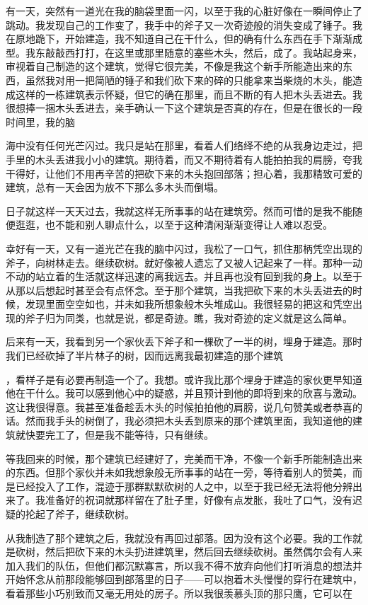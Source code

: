 \documentclass{article}
\begin{document}
有一天，突然有一道光在我的脑袋里面一闪，以至于我的心脏好像在一瞬间停止了跳动。我发现自己的工作变了，我手中的斧子又一次奇迹般的消失变成了锤子。我在原地跪下，开始建造，我不知道自己在干什么，但的确有什么东西在手下渐渐成型。我东敲敲西打打，在这里或那里随意的塞些木头，然后，成了。我站起身来，审视着自己制造的这个建筑，觉得它很完美，不像是我这个新手所能造出来的东西，虽然我对用一把简陋的锤子和我们砍下来的碎的只能拿来当柴烧的木头，能造成这样的一栋建筑表示怀疑，但它的确在那里，而且不断的有人把木头丢进去。我很想捧一捆木头丢进去，亲手确认一下这个建筑是否真的存在，但是在很长的一段时间里，我的脑

\newpage 

海中没有任何光芒闪过。我只是站在那里，看着人们络绎不绝的从我身边走过，把手里的木头丢进我小小的建筑。期待着，而又不期待着有人能拍拍我的肩膀，夸我干得好，让他们不用再辛苦的把砍下来的木头抱回部落；担心着，我那精致可爱的建筑，总有一天会因为放不下那么多木头而倒塌。

日子就这样一天天过去，我就这样无所事事的站在建筑旁。然而可惜的是我不能随便逛逛，也不能和别人聊点什么，以至于这种清闲渐渐变得让人难以忍受。

幸好有一天，又有一道光芒在我的脑中闪过，我松了一口气，抓住那柄凭空出现的斧子，向树林走去。继续砍树。就好像被人遗忘了又被人记起来了一样。那种一动不动的站立着的生活就这样迅速的离我远去。并且再也没有回到我的身上。以至于从那以后想起时甚至会有点怀念。至于那个建筑，当我把砍下来的木头丢进去的时候，发现里面空空如也，并未如我所想象般木头堆成山。我很轻易的把这和凭空出现的斧子归为同类，也就是说，都是奇迹。瞧，我对奇迹的定义就是这么简单。


后来有一天，我看到另一个家伙丢下斧子和一棵砍了一半的树，埋身于建造。那时我们已经砍掉了半片林子的树，因而远离我最初建造的那个建筑

\newpage 

，看样子是有必要再制造一个了。我想。或许我比那个埋身于建造的家伙更早知道他在干什么。我可以感到他心中的疑惑，并且预计到他的即将到来的欣喜与激动。这让我很得意。我甚至准备趁丢木头的时候拍拍他的肩膀，说几句赞美或者恭喜的话。然而我手头的树倒了，我必须把木头丢到原来的那个建筑里面，我知道他的建筑就快要完工了，但是我不能等待，只有继续。

等我回来的时候，那个建筑已经建好了，完美而干净，不像一个新手所能制造出来的东西。但那个家伙并未如我想象般无所事事的站在一旁，等待着别人的赞美，而是已经投入了工作，混迹于那群默默砍树的人之中，以至于我已经无法将他分辨出来了。我准备好的祝词就那样留在了肚子里，好像有点发胀，我吐了口气，没有迟疑的抡起了斧子，继续砍树。


从我制造了那个建筑之后，我就没有再回过部落。因为没有这个必要。我的工作就是砍树，然后把砍下来的木头扔进建筑里，然后回去继续砍树。虽然偶尔会有人来加入我们的队伍，但他们都沉默寡言，所以我不得不放弃向他们打听消息的想法并开始怀念从前那段能够回到部落里的日子——可以抱着木头慢慢的穿行在建筑中，看着那些小巧别致而又毫无用处的房子。所以我很羡慕头顶的那只鹰，它可以在
\end{document}
